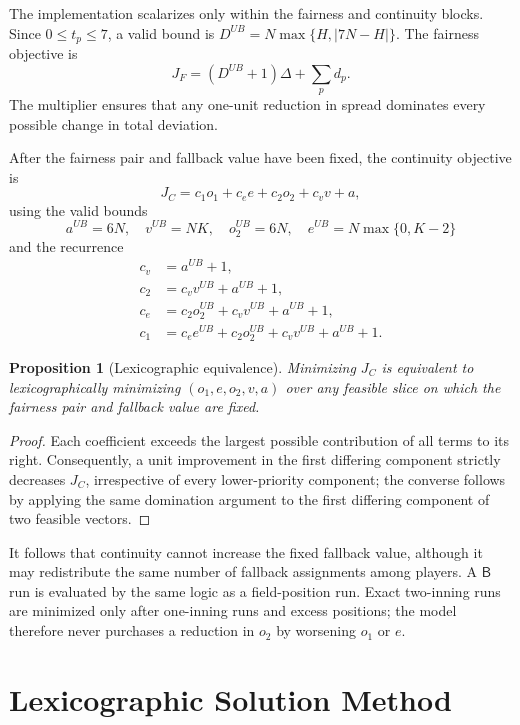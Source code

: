 \documentclass[11pt]{article}
\newcommand{\Bench}{\mathsf{B}}
\newtheorem{proposition}{Proposition}
\begin{document}
The implementation scalarizes only within the fairness and continuity blocks.
Since $0\leq t_p\leq7$, a valid bound is
$D^{UB}=N\max\{H,|7N-H|\}$. The fairness objective is
\begin{equation}
J_F=(D^{UB}+1)\Delta+\sum_p d_p.
\label{eq:fairness-objective}
\end{equation}
The multiplier ensures that any one-unit reduction in spread dominates every
possible change in total deviation.

After the fairness pair and fallback value have been fixed, the continuity
objective is
\begin{equation}
J_C=c_1o_1+c_e e+c_2o_2+c_vv+a,
\label{eq:continuity-objective}
\end{equation}
using the valid bounds
\[
a^{UB}=6N,\quad v^{UB}=NK,\quad o_2^{UB}=6N,
\quad e^{UB}=N\max\{0,K-2\}
\]
and the recurrence
\[
\begin{aligned}
c_v&=a^{UB}+1,\\
c_2&=c_vv^{UB}+a^{UB}+1,\\
c_e&=c_2o_2^{UB}+c_vv^{UB}+a^{UB}+1,\\
c_1&=c_ee^{UB}+c_2o_2^{UB}+c_vv^{UB}+a^{UB}+1.
\end{aligned}
\]

\begin{proposition}[Lexicographic equivalence]
\label{prop:lex-equivalence}
Minimizing $J_C$ is equivalent to lexicographically minimizing
$(o_1,e,o_2,v,a)$ over any feasible slice on which the fairness pair and
fallback value are fixed.
\end{proposition}
\begin{proof}
Each coefficient exceeds the largest possible contribution of all terms to its
right. Consequently, a unit improvement in the first differing component
strictly decreases $J_C$, irrespective of every lower-priority component; the
converse follows by applying the same domination argument to the first differing
component of two feasible vectors.
\end{proof}

It follows that continuity cannot increase the fixed fallback value, although
it may redistribute the same number of fallback assignments among players. A
$\Bench$ run is evaluated by the same logic as a field-position run. Exact
two-inning runs are minimized only after one-inning runs and excess positions;
the model therefore never purchases a reduction in $o_2$ by worsening $o_1$ or
$e$.

\section{Lexicographic Solution Method}
\end{document}
